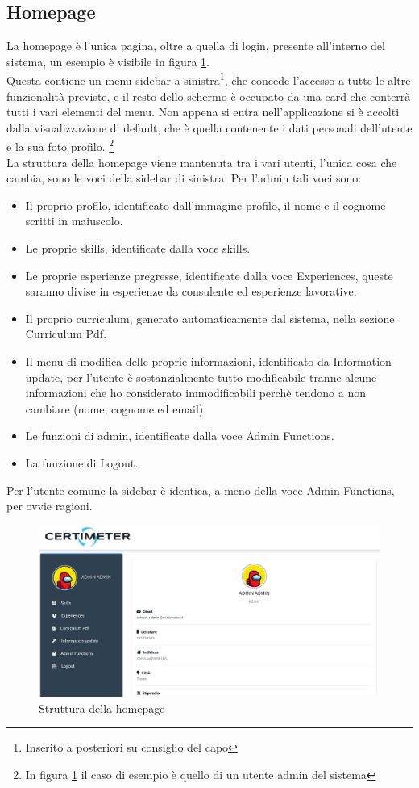 \subsection{Homepage}
La homepage è l'unica pagina, oltre a quella di login, presente all'interno del sistema, un esempio è visibile in figura \ref{fig:homepage}.
\\
Questa contiene un menu sidebar a sinistra\footnote{
Inserito a posteriori su consiglio del capo
}, che concede l'accesso a tutte le altre funzionalità previste, e il resto dello schermo è occupato da una card che conterrà tutti i vari elementi del menu. Non appena si entra nell'applicazione si è accolti dalla visualizzazione di default, che è quella contenente i dati personali dell'utente e la sua foto profilo. \footnote{
In figura \ref{fig:homepage} il caso di esempio è quello di un utente admin del sistema
}
\\
La struttura della homepage viene mantenuta tra i vari utenti, l'unica cosa che cambia, sono le voci della sidebar di sinistra. Per l'admin tali voci sono:
\begin{itemize}
    \item Il proprio profilo, identificato dall'immagine profilo, il nome e il cognome scritti in maiuscolo.
    \item Le proprie skills, identificate dalla voce skills.
    \item Le proprie esperienze pregresse, identificate dalla voce Experiences, queste saranno divise in esperienze da consulente ed esperienze lavorative.
    \item Il proprio curriculum, generato automaticamente dal sistema, nella sezione Curriculum Pdf.
    \item Il menu di modifica delle proprie informazioni, identificato da Information update, per l'utente è sostanzialmente tutto modificabile tranne alcune informazioni che ho considerato immodificabili perchè tendono a non cambiare (nome, cognome ed email).
    \item Le funzioni di admin, identificate dalla voce Admin Functions.
    \item La funzione di Logout.
\end{itemize}
Per l'utente comune la sidebar è identica, a meno della voce Admin Functions, per ovvie ragioni.

\begin{figure}[h]
    \centering
    \includegraphics[width=450px]{./images/homepage.png}
    \caption{Struttura della homepage}
    \label{fig:homepage}
\end{figure}

